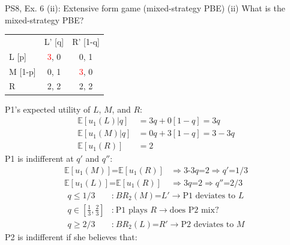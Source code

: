 \begin{frame}{PS8, Ex. 6 (ii): Extensive form game (mixed-strategy PBE)}
    (ii) What is the mixed-strategy PBE? \vspace{-10pt}
    \begin{multicols}{2}
      \begin{table}
        \begin{tabular}{l|c|c|}
          \multicolumn{1}{c}{} & \multicolumn{1}{c}{L' [q]} & \multicolumn{1}{c}{R' [1-q]} \\\cline{2-3}
          L [p]   & \textcolor{red}{3}, 0 & 0, \color{blue}1 \\\cline{2-3}
          M [1-p] & 0, \color{blue}1 & \textcolor{red}{3}, 0 \\\cline{2-3}
          R       & 2, \color{blue}2 & 2, \color{blue}2 \\\cline{2-3}
        \end{tabular}
      \end{table} \vspace{-6pt}
      P1's expected utility of $L$, $M$, and $R$: \vspace{-6pt}
      \begin{align*}
        \mathbb{E}[u_1(L)|q]&=3q+0[1-q]=3q\\
        \mathbb{E}[u_1(M)|q]&=0q+3[1-q]=3-3q\\
        \mathbb{E}[u_1(R)]&=2
      \end{align*}
      P1 is indifferent at $q'$ and $q''$: \vspace{-6pt}
      \begin{align*}
        \mathbb{E}[u_1(M)]\text{=}\mathbb{E}[u_1(R)]&\Rightarrow \text{3-3}q\text{=}2\Rightarrow q'\text{=}1/3\\
        \mathbb{E}[u_1(L)]\text{=}\mathbb{E}[u_1(R)]&\Rightarrow 3q\text{=}2\Rightarrow q''\text{=}2/3
      \end{align*} \vspace{-20pt}
      \begin{align*}
        q\leq1/3&\text{:}\ BR_2(M)\text{=}L'\rightarrow\text{P1 deviates to }L\\
        q\text{$\in$}{\textstyle\left[\frac{1}{3},\frac{2}{3}\right]}&\text{:}\ \text{P1 plays }R\rightarrow\text{does P2 mix?}\\
        q\geq2/3&\text{:}\ BR_2(L)\text{=}R'\rightarrow\text{P2 deviates to }M
      \end{align*}
      P2 is indifferent if she believes that: \vspace{-6pt}

\end{multicols}
\end{frame}
